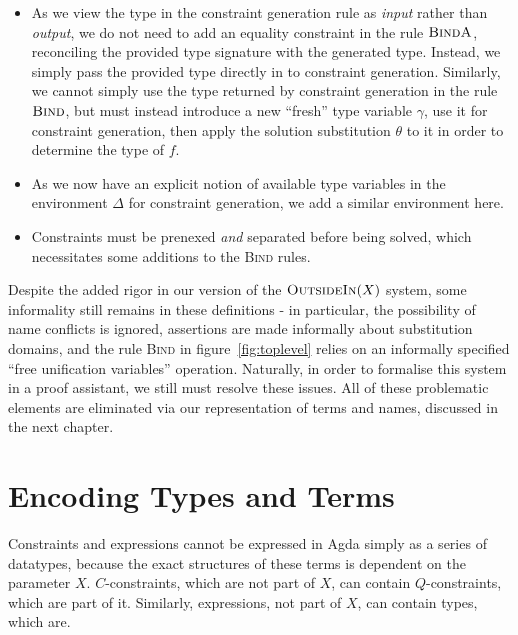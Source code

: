 \documentclass[a4paper]{jfp}
\newcommand{\outsidein}{\textsc{OutsideIn}(X)}
\begin{document}
\begin{itemize}

      \item As we view the type in the constraint generation rule as \emph{input} rather than \emph{output}, we do not need to add an equality
         constraint in the rule $\textsc{BindA}$, reconciling the provided type signature with the generated type. Instead, we simply pass the
         provided type directly in to constraint generation. Similarly, we cannot simply use the type returned by constraint generation in the rule
         $\textsc{Bind}$, but must instead introduce a new ``fresh'' type variable $\gamma$, use it for constraint generation, then apply the solution
         substitution $\theta$ to it in order to determine the type of $f$.

      \item As we now have an explicit notion of available type variables in the environment $\Delta$ for constraint generation, we add a similar
         environment here.

      \item Constraints must be prenexed \emph{and} separated before being solved, which necessitates some additions to the \textsc{Bind} rules.

\end{itemize}

Despite the added rigor in our version of the $\outsidein$ system, some informality still remains in these definitions - in particular, the
possibility of name conflicts is ignored, assertions are made informally about substitution domains, and the rule \textsc{Bind} in
figure~\ref{fig:toplevel} relies on an informally specified ``free unification variables'' operation. Naturally, in order to formalise this system in
a proof assistant, we still must resolve these issues. All of these problematic elements are eliminated via our representation of terms and names,
discussed in the next chapter.

\newpage


\section{Encoding Types and Terms}
\label{sec:terms}

Constraints and expressions cannot be expressed in Agda simply as a series of datatypes, because the exact structures of these terms is dependent on
the parameter $X$. $C$-constraints, which are not part of $X$, can contain $Q$-constraints, which are part of it. Similarly, expressions, not part of
$X$, can contain types, which are.
\end{document}
